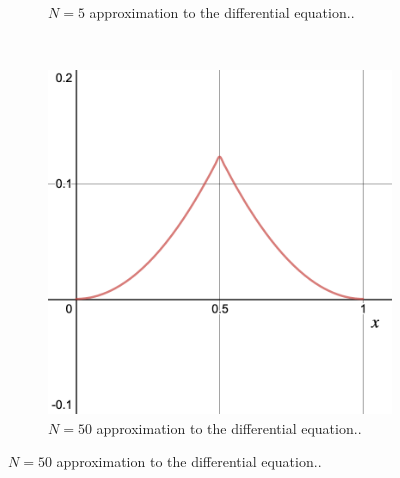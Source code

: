 \documentclass[12pt]{article} %
\begin{document}
\begin{solution}
\begin{enumerate}[(a)]
\begin{figure}[H]
\begin{subfigure}[h]{0.3\textwidth}
											\caption{$N=5$ approximation to the differential equation..}
										\end{subfigure}
										~
										\begin{subfigure}[h]{0.3\textwidth}
											\includegraphics[width=\textwidth]{Figures/fund_soln_N=50.png}
											\caption{$N=50$ approximation to the differential equation..}
										\end{subfigure}														
									\end{figure}
	\end{enumerate}
\end{solution}
\end{document}

